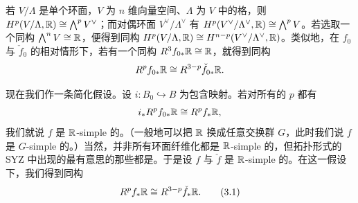 
若 $V/\Lambda$ 是单个环面，$V$ 为 $n$ 维向量空间、$\Lambda$ 为 $V$ 中的格，则 $H^p(V/\Lambda,\mathbb{R})\cong\bigwedge^pV^\vee$；而对偶环面 $V^\vee/\Lambda^\vee$ 有 $H^p(V^\vee/\Lambda^\vee,\mathbb{R})\cong\bigwedge^pV$。若选取一个同构 $\bigwedge^nV\cong\mathbb{R}$，便得到同构 $H^p(V/\Lambda,\mathbb{R})\cong H^{n-p}(V^\vee/\Lambda^\vee,\mathbb{R})$。类似地，在 $f_0$ 与 $\check f_0$ 的相对情形下，若有一个同构 $R^3f_{0*}\mathbb{R}\cong\mathbb{R}$，就得到同构
\[
R^pf_{0*}\mathbb{R}\cong R^{3-p}\check f_{0*}\mathbb{R}.
\]


现在我们作一条简化假设。设 $i:B_0\hookrightarrow B$ 为包含映射。若对所有的 $p$ 都有
\[
i_*R^pf_{0*}\mathbb{R}\cong R^pf_*\mathbb{R},
\]
我们就说 $f$ 是 $\mathbb{R}$-simple 的。（一般地可以把 $\mathbb{R}$ 换成任意交换群 $G$，此时我们说 $f$ 是 $G$-simple 的。）当然，并非所有环面纤维化都是 $\mathbb{R}$-simple 的，但拓扑形式的 SYZ 中出现的最有意思的那些都是。于是设 $f$ 与 $\check f$ 是 $\mathbb{R}$-simple 的。在这一假设下，我们得到同构
\begin{equation}
R^pf_*\mathbb{R}\cong R^{3-p}\check f_*\mathbb{R}. \tag{3.1}
\end{equation}


